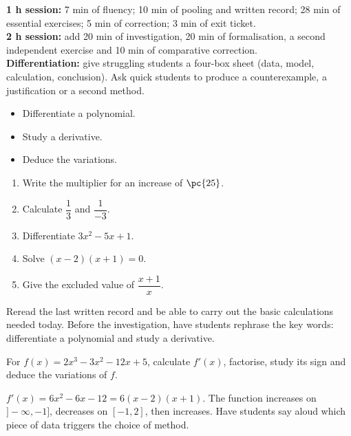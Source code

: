 \ifmxteacher
\begin{method}
\textbf{1 h session:} 7 min of fluency; 10 min of pooling and written record; 28 min of essential exercises; 5 min of correction; 3 min of exit ticket.\\
\textbf{2 h session:} add 20 min of investigation, 20 min of formalisation, a second independent exercise and 10 min of comparative correction.\\
\textbf{Differentiation:} give struggling students a four-box sheet (data, model, calculation, conclusion). Ask quick students to produce a counterexample, a justification or a second method.
\end{method}
\fi
{}
\begin{objectives}\begin{itemize}\item Differentiate a polynomial.\item Study a derivative.\item Deduce the variations.\end{itemize}\end{objectives}
\begin{fluency}\begin{enumerate}\item Write the multiplier for an increase of $\pc{25}$. \item Calculate $\dfrac1{3}$ and $\dfrac1{-3}$. \item Differentiate $3x^2-5x+1$. \item Solve $(x-2)(x+1)=0$. \item Give the excluded value of $\dfrac{x+1}{x}$. \end{enumerate}\end{fluency}
\begin{prerequisites}Reread the last written record and be able to carry out the basic calculations needed today. Before the investigation, have students rephrase the key words: differentiate a polynomial and study a derivative.\end{prerequisites}

\begin{activity}
For $f(x)=2x^3-3x^2-12x+5$, calculate $f'(x)$, factorise, study its sign and deduce the variations of $f$.

\end{activity}
\begin{solution}$f'(x)=6x^2-6x-12=6(x-2)(x+1)$. The function increases on $]-\infty,-1]$, decreases on $[-1,2]$, then increases. Have students say aloud which piece of data triggers the choice of method.\end{solution}

